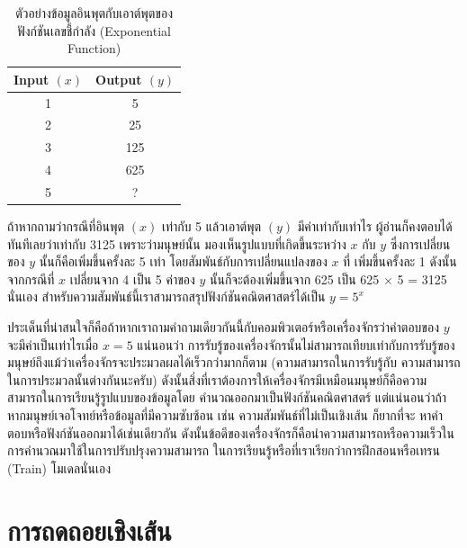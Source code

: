 \begin{table}[H]
    \centering
    \caption{ตัวอย่างข้อมูลอินพุตกับเอาต์พุตของฟังก์ชันเลขชี้กำลัง (Exponential Function)}
    \label{tab:simple_x_y}
    \begin{tabular}{cc}
        \toprule
        \textbf{Input $(x)$} & \textbf{Output $(y)$} \\
        \midrule
        1                    & 5                     \\
        2                    & 25                    \\
        3                    & 125                   \\
        4                    & 625                   \\
        5                    & ?                     \\
        \bottomrule
    \end{tabular}
\end{table}

ถ้าหากถามว่ากรณีที่อินพุต $(x)$ เท่ากับ 5 แล้วเอาต์พุต $(y)$ มีค่าเท่ากับเท่าไร ผู้อ่านก็คงตอบได้ทันทีเลยว่าเท่ากับ 3125 เพราะว่ามนุษย์นั้น%
มองเห็นรูปแบบที่เกิดขึ้นระหว่าง $x$ กับ $y$ ซึ่งการเปลี่ยนของ $y$ นั้นก็คือเพิ่มขึ้นครั้งละ 5 เท่า โดยสัมพันธ์กับการเปลี่ยนแปลงของ $x$ ที่%
เพิ่มขึ้นครั้งละ 1 ดังนั้นจากกรณีที่ $x$ เปลี่ยนจาก 4 เป็น 5 ค่าของ $y$ นั้นก็จะต้องเพิ่มขึ้นจาก 625 เป็น 625 $\times$ 5 = 3125 นั่นเอง
สำหรับความสัมพันธ์นี้เราสามารถสรุปฟังก์ชันคณิตศาสตร์ได้เป็น $y = 5^{x}$

ประเด็นที่น่าสนใจก็คือถ้าหากเราถามคำถามเดียวกันนี้กับคอมพิวเตอร์หรือเครื่องจักรว่าคำตอบของ $y$ จะมีค่าเป็นเท่าไรเมื่อ $x = 5$ แน่นอนว่า%
การรับรู้ของเครื่องจักรนั้นไม่สามารถเทียบเท่ากับการรับรู้ของมนุษย์ถึงแม้ว่าเครื่องจักรจะประมวลผลได้เร็วกว่ามากก็ตาม (ความสามารถในการรับรู้กับ%
ความสามารถในการประมวลนั้นต่างกันนะครับ) ดังนั้นสิ่งที่เราต้องการให้เครื่องจักรมีเหมือนมนุษย์ก็คือความสามารถในการเรียนรู้รูปแบบของข้อมูลโดย%
คำนวณออกมาเป็นฟังก์ชันคณิตศาสตร์ แต่แน่นอนว่าถ้าหากมนุษย์เจอโจทย์หรือข้อมูลที่มีความซับซ้อน เช่น ความสัมพันธ์ที่ไม่เป็นเชิงเส้น ก็ยากที่จะ%
หาคำตอบหรือฟังก์ชันออกมาได้เช่นเดียวกัน ดังนั้นข้อดีของเครื่องจักรก็คือนำความสามารถหรือความเร็วในการคำนวณมาใช้ในการปรับปรุงความสามารถ%
ในการเรียนรู้หรือที่เราเรียกว่าการฝึกสอนหรือเทรน (Train) โมเดลนั่นเอง

\section{การถดถอยเชิงเส้น}
\label{sec:lin_res}

